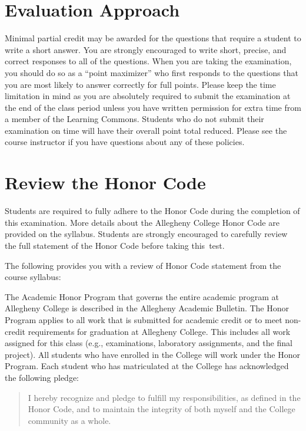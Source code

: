 \section*{Evaluation Approach}

\vspace*{-.05in}
\noindent Minimal partial credit may be awarded for the questions that require a student to write a short answer. You
are strongly encouraged to write short, precise, and correct responses to all of the questions. When you are taking the
examination, you should do so as a ``point maximizer'' who first responds to the questions that you are most likely to
answer correctly for full points. Please keep the time limitation in mind as you are absolutely required to submit the
examination at the end of the class period unless you have written permission for extra time from a member of the
Learning Commons. Students who do not submit their examination on time will have their overall point total reduced.
Please see the course instructor if you have questions about any of these policies.

\vspace*{-.2in}
\section*{Review the Honor Code}
\vspace*{-.1in}

\noindent Students are required to fully adhere to the Honor Code during the completion of this examination. More
details about the Allegheny College Honor Code are provided on the syllabus. Students are strongly encouraged to
carefully review the full statement of the Honor Code before taking \mbox{this test}.

\noindent The following provides you with a review of Honor Code statement from the course syllabus:

The Academic Honor Program that governs the entire academic program at Allegheny College is described in the Allegheny
Academic Bulletin.  The Honor Program applies to all work that is submitted for academic credit or to meet non-credit
requirements for graduation at Allegheny College.  This includes all work assigned for this class (e.g., examinations,
laboratory assignments, and the final project).  All students who have enrolled in the College will work under the Honor
Program.  Each student who has matriculated at the College has acknowledged the following pledge:

\vspace*{-.11in}
\begin{quote}
  I hereby recognize and pledge to fulfill my responsibilities, as defined in the Honor Code, and to maintain the
  integrity of both myself and the College community as a whole.
\end{quote}
\vspace*{-.11in}

